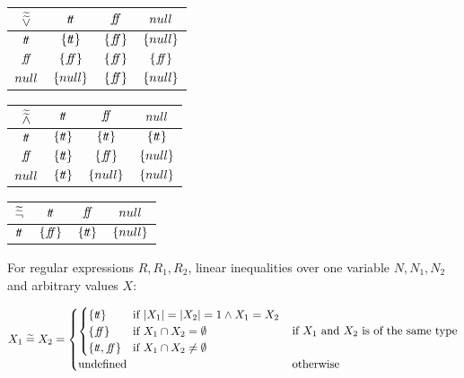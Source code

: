 \begin{table}[H]
    \centering
    \begin{tabular}{c|ccc}
        $\widetilde{\widetilde{\lor}}$ & $t\!t$ & $f\!\!f$ & $null$ \\
        \hline
        $t\!t$ & $\{t\!t\}$ & $\{f\!\!f\}$ & $\{null\}$ \\
        $f\!\!f$ & $\{f\!\!f\}$ & $\{f\!\!f\}$ & $\{f\!\!f\}$ \\
        $null$ & $\{null\}$ & $\{f\!\!f\}$ & $\{null\}$ \\
    \end{tabular}
    \label{tab:aaablor}
\end{table}

\begin{table}[H]
    \centering
    \begin{tabular}{c|ccc}
        $\widetilde{\widetilde{\land}}$ & $t\!t$ & $f\!\!f$ & $null$ \\
        \hline
        $t\!t$ & $\{t\!t\}$ & $\{t\!t\}$ & $\{t\!t\}$ \\
        $f\!\!f$ & $\{t\!t\}$ & $\{f\!\!f\}$ & $\{null\}$ \\
        $null$ & $\{t\!t\}$ & $\{null\}$ & $\{null\}$ \\
    \end{tabular}
    \label{tab:aaabland}
\end{table}

\begin{table}[H]
    \centering
    \begin{tabular}{c|ccc}
        $\widetilde{\widetilde{\neg}}$ & $t\!t$ & $f\!\!f$ & $null$ \\
        \hline
        $t\!t$ & $\{f\!\!f\}$ & $\{t\!t\}$ & $\{null\}$ \\
    \end{tabular}
    \label{tab:aaabneg}
\end{table}

For regular expressions $R, R_1, R_2$, linear inequalities over one variable $N, N_1, N_2$ and arbitrary values $X$:

\begin{align}
    X_1 \;\widetilde{=}\; X_2 &= \begin{cases}
        \begin{cases}
        \{t\!t \} & \text{if } |X_1| = |X_2| = 1 \land X_1 = X_2 \\
        \{f\!\!f\} & \text{if } X_1 \cap X_2 = \emptyset \\
        \{t\!t, f\!\!f\} & \text{if } X_1 \cap X_2 \neq \emptyset
        \end{cases} & \text{if $X_1$ and $X_2$ is of the same type} \\
        \text{undefined} & \text{otherwise}
    \end{cases} \\
\end{align}

